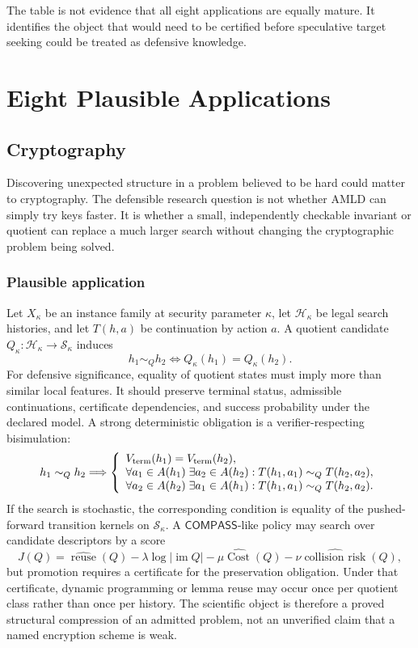 \documentclass[11pt,oneside]{book}
\theoremstyle{definition}
\theoremstyle{remark}
\newcommand{\COMPASS}{\mathsf{COMPASS}}
\newcommand{\Cost}{\operatorname{Cost}}
\begin{document}
The table is not evidence that all eight applications are equally mature. It identifies the object
that would need to be certified before speculative target seeking could be treated as defensive
knowledge.

\part{Eight Plausible Applications}

\chapter{Cryptography}
\label{ch:crypto}

Discovering unexpected structure in a problem believed to be hard could matter to cryptography.
The defensible research question is not whether AMLD can simply try keys faster. It is whether a
small, independently checkable invariant or quotient can replace a much larger search without
changing the cryptographic problem being solved.

\section{Plausible application}
Let \(X_\kappa\) be an instance family at security parameter \(\kappa\), let \(\mathcal H_\kappa\)
be legal search histories, and let \(T(h,a)\) be continuation by action \(a\). A quotient candidate
\(Q_\kappa:\mathcal H_\kappa\to\mathcal S_\kappa\) induces
\[
h_1\sim_Qh_2\iff Q_\kappa(h_1)=Q_\kappa(h_2).
\]
For defensive significance, equality of quotient states must imply more than similar local features.
It should preserve terminal status, admissible continuations, certificate dependencies, and success
probability under the declared model. A strong deterministic obligation is a verifier-respecting
bisimulation:
\[
h_1\sim_Qh_2\Longrightarrow
\left\{
\begin{array}{l}
V_{\rm term}(h_1)=V_{\rm term}(h_2),\\
\forall a_1\in A(h_1)\;\exists a_2\in A(h_2):T(h_1,a_1)\sim_QT(h_2,a_2),\\
\forall a_2\in A(h_2)\;\exists a_1\in A(h_1):T(h_1,a_1)\sim_QT(h_2,a_2).
\end{array}\right.
\]
If the search is stochastic, the corresponding condition is equality of the pushed-forward
transition kernels on \(\mathcal S_\kappa\). A \(\COMPASS\)-like policy may search over candidate
descriptors by a score
\[
J(Q)=\widehat{\operatorname{reuse}}(Q)-\lambda\log|\operatorname{im}Q|
-\mu\widehat{\Cost}(Q)-\nu\widehat{\operatorname{collision\ risk}}(Q),
\]
but promotion requires a certificate for the preservation obligation. Under that certificate, dynamic
programming or lemma reuse may occur once per quotient class rather than once per history. The
scientific object is therefore a proved structural compression of an admitted problem, not an
unverified claim that a named encryption scheme is weak.
\end{document}
